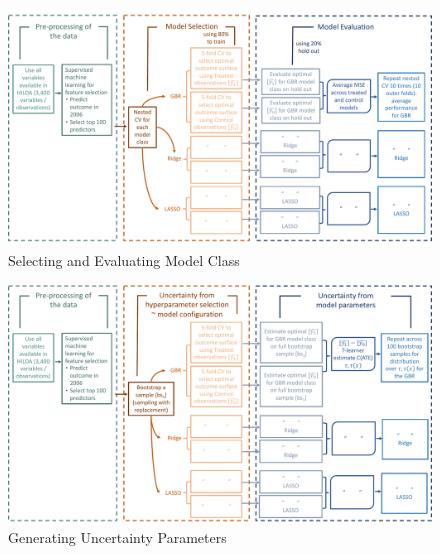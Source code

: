 \documentclass[12pt, a4paper]{article}
\begin{document}
\begin{landscape}
\clearpage
\begin{figure}[htbp]
\centering
\caption{Selecting and Evaluating Model Class}
  \label{fig:exp_model}
    \includegraphics[scale=0.65]{_figures/explainer1.pdf}
\end{figure}

\begin{figure}[htbp]
\centering
\caption{Generating Uncertainty Parameters}
  \label{fig:exp_param}
    \includegraphics[scale=0.65]{_figures/explainer2.pdf}
\end{figure}


\end{landscape} 
\end{document}

